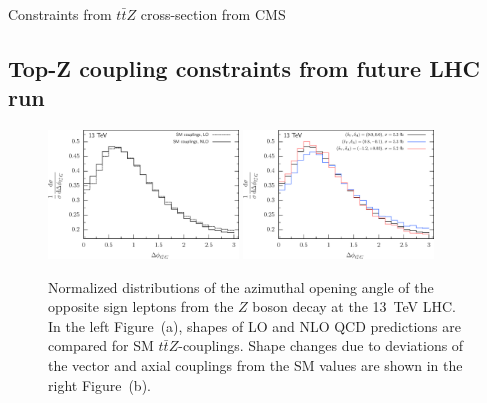 \documentclass[preprint]{JHEP3} %
\def\ttbZ{t\bar{t}Z}
\begin{document}
Constraints from $t\bar{t}Z$ cross-section from CMS \\

\subsection{Top-Z coupling constraints from future LHC run}


\begin{figure}[t]
\centering %
\includegraphics[width=0.45\textwidth]{./LHC_53_Fig17a.eps}
\hfill
\includegraphics[width=0.45\textwidth]{./LHC_53_Fig17b.eps}
\caption{\label{fig:iii}
Normalized distributions of the azimuthal opening angle of the opposite sign leptons from the $Z$ boson decay at the 13~TeV LHC.
In the left Figure~(a), shapes of LO and NLO QCD predictions are compared for SM $\ttbZ$-couplings.
Shape changes due to deviations of the vector and axial couplings from the SM values are shown in the right Figure~(b).
}
\end{figure}
\end{document}
